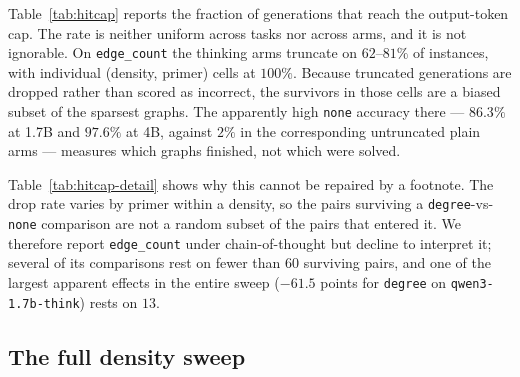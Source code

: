 \documentclass[11pt]{article}
\begin{document}
Table~\ref{tab:hitcap} reports the fraction of generations that reach the
output-token cap. The rate is neither uniform across tasks nor across arms, and it is not
ignorable. On \texttt{edge\_count} the thinking arms truncate on
$62$--$81\%$ of instances, with individual (density, primer) cells at
$100\%$. Because truncated generations are dropped rather than scored as
incorrect, the survivors in those cells are a biased subset of the sparsest
graphs. The apparently high \texttt{none} accuracy there --- $86.3\%$ at
1.7B and $97.6\%$ at 4B, against $2\%$ in the corresponding untruncated
plain arms --- measures which graphs finished, not which were solved.

Table~\ref{tab:hitcap-detail} shows why this cannot be repaired by a
footnote. The drop rate varies by primer within a density, so the pairs
surviving a \texttt{degree}-vs-\texttt{none} comparison are not a random
subset of the pairs that entered it. We therefore report
\texttt{edge\_count} under chain-of-thought but decline to interpret it;
several of its comparisons rest on fewer than $60$ surviving pairs, and one
of the largest apparent effects in the entire sweep ($-61.5$ points for
\texttt{degree} on \texttt{qwen3-1.7b-think}) rests on $13$.

\subsection{The full density sweep}
\label{sec:results-main}
\end{document}
